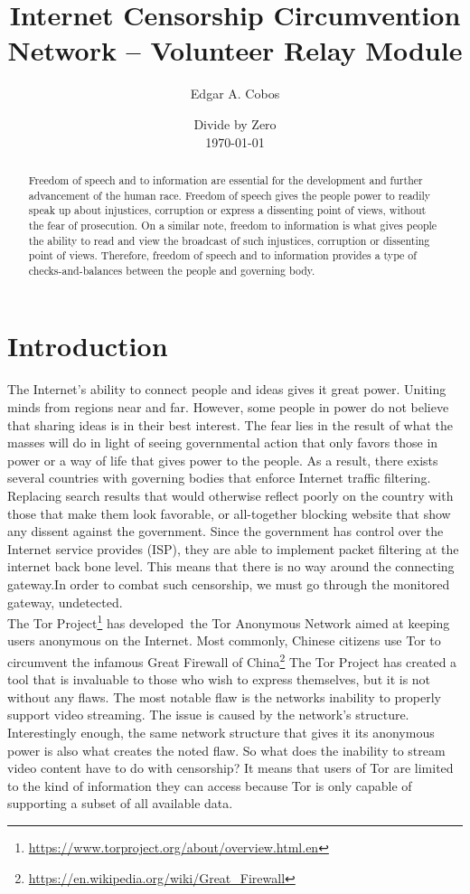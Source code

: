 \documentclass[12pt,a4paper]{report}
\title{Internet Censorship Circumvention Network – Volunteer Relay Module}
\author{Edgar A. Cobos}
\date{Divide by Zero\\\today}
\begin{document}
\maketitle

\begin{abstract}
Freedom of speech and to information are essential for the development and further advancement of the human race. Freedom of speech gives the people power to readily speak up about injustices, corruption or express a dissenting point of views, without the fear of prosecution. On a similar note, freedom to information is what gives people the ability to read and view the broadcast of such injustices, corruption or dissenting point of views. Therefore, freedom of speech and to information provides a type of checks-and-balances between the people and governing body. 


\end{abstract}

\renewcommand{\chaptername}{Section}
\tableofcontents

\chapter{Introduction}
The Internet’s ability to connect people and ideas gives it great power. Uniting minds from regions near and far. However, some people in power do not believe that sharing ideas is in their best interest. The fear lies in the result of what the masses will do in light of seeing governmental action that only favors those in power or a way of life that gives power to the people. As a result, there exists several countries with governing bodies that enforce Internet traffic filtering. Replacing search results that would otherwise reflect poorly on the country with those that make them look favorable, or all-together blocking website that show any dissent against the government. Since the government has control over the Internet service provides (ISP), they are able to implement packet filtering at the internet back bone level. This means that there is no way around the connecting gateway.In order to combat such censorship, we must go through the monitored gateway, undetected.\\

The Tor Project\footnote{\url{https://www.torproject.org/about/overview.html.en}} has developed the Tor Anonymous Network aimed at keeping users anonymous on the Internet. Most commonly, Chinese citizens use Tor to circumvent the infamous Great Firewall of China\footnote{\url{https://en.wikipedia.org/wiki/Great_Firewall}} The Tor Project has created a tool that is invaluable to those who wish to express themselves, but it is not without any flaws. The most notable flaw is the networks inability to properly support video streaming. The issue is caused by the network's structure. Interestingly enough, the same network structure that gives it its anonymous power is also what creates the noted flaw. So what does the inability to stream video content have to do with censorship? It means that users of Tor are limited to the kind of information they can access because Tor is only capable of supporting a subset of all available data.\\ 
    
\end{document}
